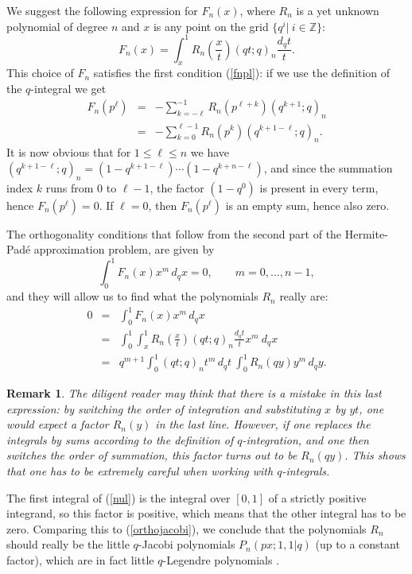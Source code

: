 \documentclass[12pt]{article}
\newtheorem{remark}[theorem]{Remark}
\numberwithin{equation}{section}
\begin{document}
We suggest the following expression for $F_n(x)$, where
$R_n$ is a yet unknown polynomial of degree $n$ and $x$ is any
point on the grid $\{q^i |\ i\in\mathbb{Z}\}$:
\begin{equation}\label{fnxint}
  F_n(x) =
\int_x^1R_n\left(\frac{x}{t}\right) (qt;q)_n\frac{d_{q}t}{t}.
\end{equation}
This choice of $F_n$ satisfies the first condition
(\ref{fnpl}): if we use the definition of the $q$-integral we get
\begin{eqnarray}
  \nonumber F_n(p^\ell) &=& -\sum_{k=-\ell}^{-1}
  R_n(p^{\ell+k})(q^{k+1};q)_n   \\
  &=& -\sum_{k=0}^{\ell-1}
  R_n(p^{k})(q^{k+1-\ell};q)_n.
\end{eqnarray}
It is now obvious that for $1\leq \ell\leq n$ we have
$(q^{k+1-\ell};q)_n=(1-q^{k+1-\ell}) \cdots (1-q^{k+n-\ell})$,
and since the summation index $k$ runs from $0$ to $\ell-1$, the
factor $(1-q^0)$ is present in every term, hence
$F_n(p^\ell)=0$.  If $\ell=0$, then $F_n(p^\ell)$ is an empty sum, hence also zero.

The orthogonality conditions that follow from the second part of
the Hermite-Pad\'{e} approximation problem, are given by
\begin{equation}\label{orthoconds}
\int_0^1 F_n(x)x^m\,d_{q}x =0, \qquad m=0,...,n-1,
\end{equation}
and they will allow us to find what the polynomials $R_n$ really
are:
\begin{eqnarray}
 \nonumber 0 &=& \int_0^1 F_n(x)x^m\, d_{q}x \\
 \nonumber  &=& \int_0^1\int_x^1 R_n\left(\frac{x}{t}\right)(qt;q)_n\frac{d_{q}t}{t}x^m\ d_{q}x \\
 \label{nul}  &=& q^{m+1}\int_0^1(qt;q)_nt^m\, d_{q}t \
 \int_0^1R_n(qy)y^m\,d_{q}y.
\end{eqnarray}

\begin{remark}
\rm The diligent reader may think that there
is a mistake in this last expression: by switching the order
of integration and substituting $x$ by $yt$, one would expect a
factor $R_n(y)$ in the last line.  However, if one replaces the
integrals by sums according to the definition of $q$-integration,
and one then switches the order of summation, this factor turns
out to be $R_n(qy)$.  This shows that one has to be extremely
careful when working with $q$-integrals.
\end{remark}

The first integral of (\ref{nul}) is the integral over $[0,1]$ of
a strictly positive integrand, so this factor is positive, which
means that the other integral has to be zero. Comparing this to
(\ref{orthojacobi}), we conclude that the polynomials $R_n$
should really be the little
$q$-Jacobi polynomials $P_n\left(px;1,1|q\right)$ (up to a constant factor),
which are in fact little $q$-Legendre polynomials \cite[\S 3.12.1]{Koekoek}.
\end{document}
